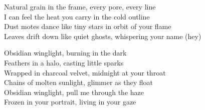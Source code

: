 \begin{lyrics}
Natural grain in the frame, every pore, every line\\
I can feel the heat you carry in the cold outline\\
Dust motes dance like tiny stars in orbit of your flame\\
Leaves drift down like quiet ghosts, whispering your name (hey)

Obsidian winglight, burning in the dark\\
Feathers in a halo, casting little sparks\\
Wrapped in charcoal velvet, midnight at your throat\\
Chains of molten sunlight, glimmer as they float\\
Obsidian winglight, pull me through the haze\\
Frozen in your portrait, living in your gaze
\end{lyrics}

